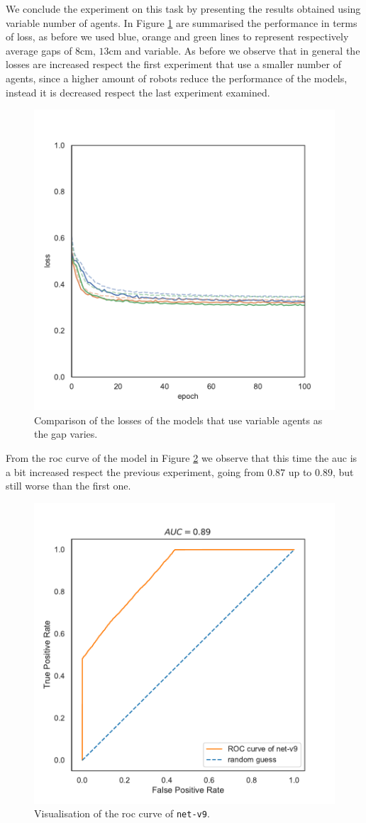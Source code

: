 We conclude the experiment on this task by presenting the results obtained using 
variable number of agents. In Figure \ref{fig:commlossnvart2} are summarised the 
performance in terms of loss, as before we used blue, orange and green lines to 
represent respectively average gaps of $8$\gls{cm}, $13$\gls{cm} and variable. 
As before we observe that in general the losses are increased respect the first 
experiment that use a smaller number of agents, since a higher amount of robots 
reduce the performance of the models, instead it is decreased respect the last 
experiment examined.
\begin{figure}[!htb]
	\centering
	\includegraphics[width=.45\textwidth]{contents/images/task2/loss-communication-Nvar}
	\caption{Comparison of the losses of the models that use variable agents as the 
	gap varies.}
	\label{fig:commlossnvart2}
\end{figure}

From the \gls{roc} curve of the model in Figure \ref{fig:net-v9auc}  we observe 
that this time the \gls{auc} is a bit increased respect the previous experiment, 
going from $0.87$ up to $0.89$, but still worse than the first one.
\begin{figure}[!htb]
	\centering
	\includegraphics[width=.45\textwidth]{contents/images/net-v9/roc-net-v9(a)}%
	\caption[Evaluation of the \gls{roc} of \texttt{net-v9}.]{Visualisation of the 
		\gls{roc} curve of \texttt{net-v9}.}
	\label{fig:net-v9auc}
\end{figure}

